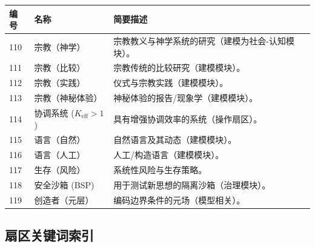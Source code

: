 \documentclass[11pt,a4paper]{article}
\newcommand{\Keff}{K_{\mathrm{eff}}}
\begin{document}
	\begin{longtable}{|p{0.9cm}|p{6.0cm}|p{8.6cm}|}
		\hline
		\textbf{编号} & \textbf{名称} & \textbf{简要描述} \\
		\hline
		\endhead
		110 & 宗教（神学） & 宗教教义与神学系统的研究（建模为社会-认知模块）。 \\
		111 & 宗教（比较） & 宗教传统的比较研究（建模模块）。 \\
		112 & 宗教（实践） & 仪式与宗教实践（建模模块）。 \\
		113 & 宗教（神秘体验） & 神秘体验的报告/现象学（建模模块）。 \\
		114 & 协调系统 ($\Keff>1$) & 具有增强协调效率的系统（操作扇区）。 \\
		115 & 语言（自然） & 自然语言及其动态（建模模块）。 \\
		116 & 语言（人工） & 人工/构造语言（建模模块）。 \\
		117 & 生存（风险） & 系统性风险与生存策略。 \\
		118 & 安全沙箱 (BSP) & 用于测试新思想的隔离沙箱（治理模块）。 \\
		119 & 创造者（元层） & 编码边界条件的元场（模型相关）。 \\
		\hline
	\end{longtable}
	
	\subsection*{扇区关键词索引}
	
\end{document}
